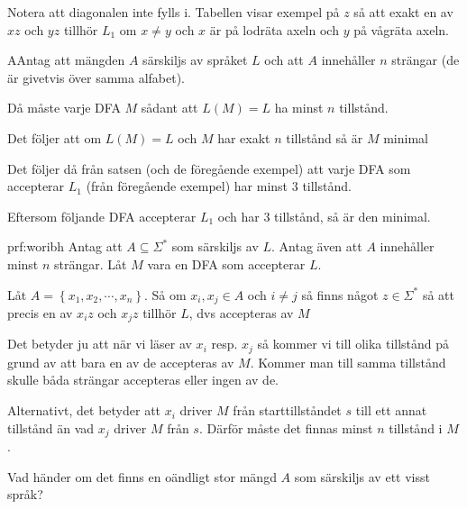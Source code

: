 \par\bigskip
\noindent Notera att diagonalen inte fylls i. Tabellen visar exempel på $z$ så att exakt en av $xz$ och $yz$ tillhör $L_1$ om $x\neq y$ och $x$ är på lodräta axeln och $y$ på vågräta axeln.
\newpage
\begin{theo}
  AAntag att mängden $A$ särskiljs av språket $L$ och att $A$ innehåller $n$ strängar (de är givetvis över samma alfabet).\par
  \noindent Då måste varje DFA $M$ sådant att $L(M)=L$ ha minst $n$ tillstånd.
  \par\bigskip
  \noindent Det följer att om $L(M)=L$ och $M$ har exakt $n$ tillstånd så är $M$ minimal
\end{theo}
\par\bigskip
\noindent Det följer då från satsen (och de föregående exempel) att varje DFA som accepterar $L_1$ (från föregående exempel) har minst 3 tillstånd.
\par\bigskip
\noindent Eftersom följande DFA accepterar $L_1$ och har 3 tillstånd, så är den minimal. 
\begin{figure}[ht!]
    \centering
    \caption{}
\end{figure}
\par\bigskip
\begin{prf}[Sats 9.7]{prf:woribh}
  Antag att $A\subseteq\Sigma^*$ som särskiljs av $L$. Antag även att $A$ innehåller minst $n$ strängar. Låt $M$ vara en DFA som accepterar $L$.\par
  \noindent Låt $A = \left\{x_1,x_2,\cdots,x_n\right\}$. Så om $x_i, x_j\in A$ och $i\neq j$ så finns något $z\in\Sigma^*$ så att precis en av $x_iz$ och $x_jz$ tillhör $L$, dvs accepteras av $M$
  \par\bigskip
  \noindent Det betyder ju att när vi läser av $x_i$ resp. $x_j$ så kommer vi till olika tillstånd på grund av att bara en av de accepteras av $M$. Kommer man till samma tillstånd skulle båda strängar accepteras eller ingen av de. 
  \par\bigskip
  \noindent Alternativt, det betyder att $x_i$ driver $M$ från starttillståndet $s$ till ett annat tillstånd än vad $x_j$ driver $M$ från $s$. Därför måste det finnas minst $n$ tillstånd i $M$.
\end{prf}
\par\bigskip
\noindent Vad händer om det finns en oändligt stor mängd $A$ som särskiljs av ett visst språk?

